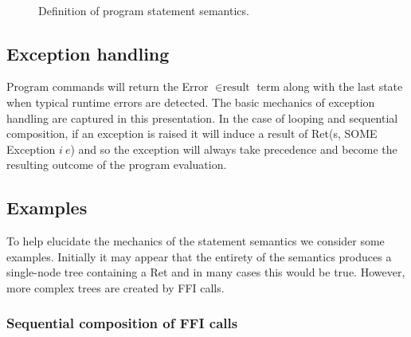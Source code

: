 \documentclass{article}
\begin{document}
\begin{figure}[H]
\begin{align*}
  \end{align*}
  \caption{Definition of program statement semantics.}
  \label{fig:sem_prog_cmd}
\end{figure}


\subsection{Exception handling}
\label{sec:exception-handling}

Program commands will return the Error $\in \text{result}$ term along with the last state when typical runtime errors are detected. The basic mechanics of exception handling are captured in this presentation. In the case of looping and sequential composition, if an exception is raised it will induce a result of Ret(s, SOME Exception $i\ e$) and so the exception will always take precedence and become the resulting outcome of the program evaluation.

\subsection{Examples}
\label{sec:examples}

To help elucidate the mechanics of the statement semantics we consider some examples. Initially it may appear that the entirety of the semantics produces a single-node tree containing a Ret and in many cases this would be true. However, more complex trees are created by FFI calls.

\subsubsection{Sequential composition of FFI calls}
\label{sec:sequ-comp-ffi}
\end{document}
